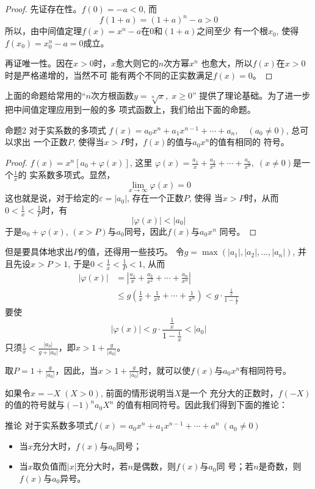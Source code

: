 \begin{proof}
    先证存在性。$f(0)=-a<0$, 而
\[f(1+a)=(1+a)^n-a>0\]
所以，由中间值定理$f(x)=x^n-a$在0和$(1+a)$之间至少
有一个根$x_0$, 使得$f(x_0)=x_0^n-a=0$成立。

再证唯一性。因在$x>0$时，$x$愈大则它的$n$次方幂$x^n$
也愈大，所以$f(x)$在$x>0$时是严格递增的，当然不可
能有两个不同的正实数满足$f(x)=0$。
\end{proof}

上面的命题给常用的“$n$次方根函数$y=\sqrt[n]{x},\; x\ge0$”
提供了理论基础。为了进一步把中间值定理应用到一般的多
项式函数上，我们给出下面的命题。

\begin{blk}{命题2 }
对于实系数的多项式
$f(x)=a_0x^n+a_1x^{n-1}+\cdots+a_n,\quad (a_0\ne 0)$, 总可以求出
一个正数$P$, 使得当$x>P$时，$f(x)$的值与$a_0x^n$的值有相同的
符号。
\end{blk}

\begin{proof}
$f(x)=x^n[a_0+\varphi(x)]$, 这里
$\varphi(x)=\frac{a_1}{x}+\frac{a_2}{x^2}+\cdots+\frac{a_n}{x^n},\; (x\ne 0)$是一个$\frac{1}{x}$的
实系数多项式。显然，
\[\lim_{x\to\infty} \varphi(x)=0\]
这也就是说，对于给定的$\varepsilon=|a_0|$, 存在一个正数$P$, 使得
当$x>P$时，从而$0<\frac{1}{x}<\frac{1}{P}$时，有
\[|\varphi(x)|<|a_0|\]
于是$a_0+\varphi(x)$, $(x>P)$与$a_0$同号，因此$f(x)$与$a_0x^n$
同号。
\end{proof}

但是要具体地求出$P$的值，还得用一些技巧。
令$g=\max(|a_1|,|a_2|,\ldots,|a_n|)$, 并且先设$x>P>
1$, 于是$0<\frac{1}{x}<\frac{1}{P}<1$, 从而
\[\begin{split}
    |\varphi(x)|&=\left|\frac{a_1}{x}+\frac{a_2}{x^2}+\cdots+\frac{a_n}{x^n}\right|\\
    &\le g\left(\frac{1}{x}+\frac{1}{x^2}+\cdots+\frac{1}{x^n}\right)< g\cdot \frac{\frac{1}{x}}{1-\frac{1}{x}}
\end{split}\]
要使
\[|\varphi(x)|<g\cdot \frac{\frac{1}{x}}{1-\frac{1}{x}}<|a_0|\]
只须$\frac{1}{x}<\frac{|a_0|}{g+|a_0|}$，即$x>1+\frac{g}{|a_0|}$。

取$P=1+\frac{g}{|a_0|}$，因此，当$x>1+\frac{g}{|a_0|}$时，就可以使$f(x)$与$a_0x^n$有相同符号。

如果令$x=-X\; (X>0)$, 前面的情形说明当$X$是一个
充分大的正数时，$f(-X)$的值的符号就与$(-1)^na_0X^n$
的值有相同符号。因此我们得到下面的推论：

\begin{blk}{推论}
    对于实系数多项式$f(x)=a_0x^n+a_1x^{n-1}+\cdots+a^n\; (a_0\ne 0)$
\begin{itemize}
    \item 当$x$充分大时，$f(x)$与$a_0$同号；
    \item 当$x$取负值而$|x|$充分大时，若$n$是偶数，则$f(x)$与$a_0$同
号；若$n$是奇数，则$f(x)$与$a_0$异号。
\end{itemize}
\end{blk}

